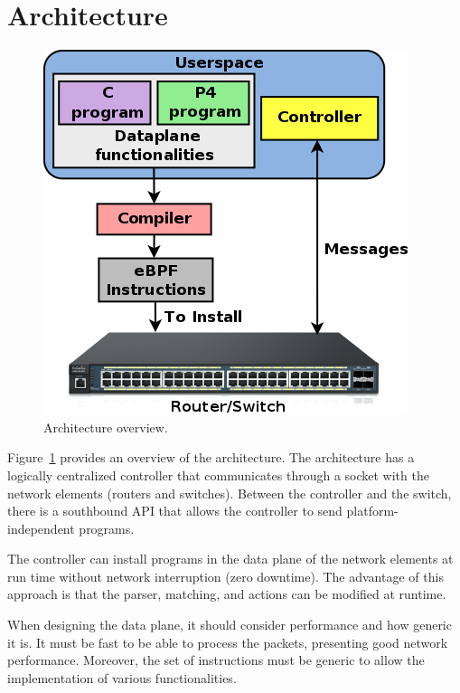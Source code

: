 \section{Architecture}
\label{sec:architecture}

 \begin{figure}[!htp]
 \centering
\includegraphics[width=.8\linewidth]{figures/03_fig01.png}
 \caption{Architecture overview.}
 \label{fig:03architecture}
 \end{figure}

Figure~\ref{fig:03architecture} provides an overview of the architecture.
The architecture has a logically centralized controller that communicates through a socket with the network elements (routers and switches). 
Between the controller and the switch, there is a southbound API that allows the controller to send platform-independent programs.

The controller can install programs in the data plane of the network elements at run time without network interruption (zero downtime).
The advantage of this approach is that the parser, matching, and actions can be modified at runtime.


When designing the data plane, it should consider performance and how generic it is. It must be fast to be able to process the packets, presenting good network performance. Moreover,
the set of instructions must be generic to allow the implementation of various functionalities.

